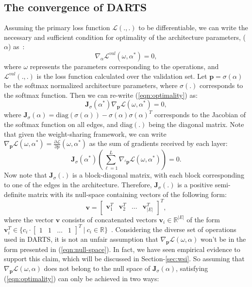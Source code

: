 \documentclass{article} \usepackage{fancyhdr, iclr2023_conference, times}
\def\vp{{\bm{p}}}
\def\vv{{\bm{v}}}
\def\mJ{{\bm{J}}}
\begin{document}
\subsection{The convergence of DARTS}
Assuming the primary loss function $\mathcal{L}(., .)$ to be differentiable, we can write the necessary and sufficient condition for optimality of the architecture parameters, ($\alpha$) as~\citep{DBLP:books/cu/BV2014}:
\begin{equation}
\label{eqn:optimality}
    \nabla_\alpha \mathcal{L}^{val}(\omega, \alpha^*)=0,
\end{equation}
where $\omega$ represents the parameters corresponding to the operations, and $\mathcal{L}^{val}(., .)$ is the loss function calculated over the validation set. Let $\vp=\sigma(\alpha)$ be the softmax normalized architecture parameters, where $\sigma(.)$ corresponds to the softmax function. Then we can re-write (\ref{eqn:optimality}) as:
\begin{equation}
    \mJ_\sigma (\alpha^*) \nabla_\vp \mathcal{L}(\omega, \alpha^*) = 0,
\end{equation}
where $\mJ_\sigma(\alpha)=\text{diag}(\sigma(\alpha))-\sigma(\alpha)\sigma(\alpha)^T$ corresponds to the Jacobian of the softmax function on all edges, and $\text{diag}(.)$ being the diagonal matrix. Note that given the weight-sharing framework, we can write $\nabla_\vp\mathcal{L}(\omega, \alpha^*)=\frac{\partial \mathcal{L}}{\partial p}(\omega, \alpha^*)$ as the sum of gradients received by each layer:
\begin{equation}
    \mJ_\sigma (\alpha^*) \left(\sum_{\ell=1}^L \nabla_{{}^\ell \vp}\mathcal{L}(\omega, \alpha^*)\right) = 0.
\end{equation}
Now note that $\mJ_\sigma(.)$ is a block-diagonal matrix, with each block corresponding to one of the edges in the architecture. Therefore, $\mJ_\sigma(.)$ is a positive semi-definite matrix with its null-space containing vectors of the following form:
\begin{equation}
\label{eqn:null-space}
    \vv=\begin{bmatrix}
    \vv_1^T&\vv_2^T&\dots&\vv_{\vert E\vert}^T
    \end{bmatrix}^T,
\end{equation} 
where the vector $\vv$ consists of concatenated vectors $\vv_i\in \mathbb{R}^{|E|}$ of the form $\vv_i^T\in \{c_i\cdot\begin{bmatrix}1&1&\dots&1\end{bmatrix}^T~|~c_i\in \mathbb{R}\}$~\citep{DBLP:journals/corr/abs-1704-00805}. Considering the diverse set of operations used in DARTS, it is not an unfair assumption that $\nabla_\vp\mathcal{L}(\omega, \alpha)$ won't be in the form presented in (\ref{eqn:null-space}). In fact, we have seen empirical evidence to support this claim, which will be discussed in Section-\ref{sec:wsi}. So assuming that $\nabla_\vp\mathcal{L}(\omega, \alpha)$ does not belong to the null space of $\mJ_\sigma(\alpha)$, satisfying (\ref{eqn:optimality}) can only be achieved in two ways:
\end{document}

